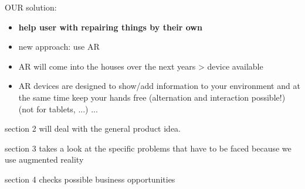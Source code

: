 	OUR solution:
	\begin{itemize}
		\itemsep0em
		\item \textbf{help user with repairing things by their own}
		\item new approach: use AR
		\item AR will come into the houses over the next years > device available
		\item AR devices are designed to show/add information to your environment and at the same time keep your hands free (alternation and interaction possible!) (not for tablets, ...) ...
	\end{itemize}
	
	
	section 2 will deal with the general product idea.
	
	section 3 takes a look at the specific problems that have to be faced because we use augmented reality
	
	section 4 checks possible business opportunities
	